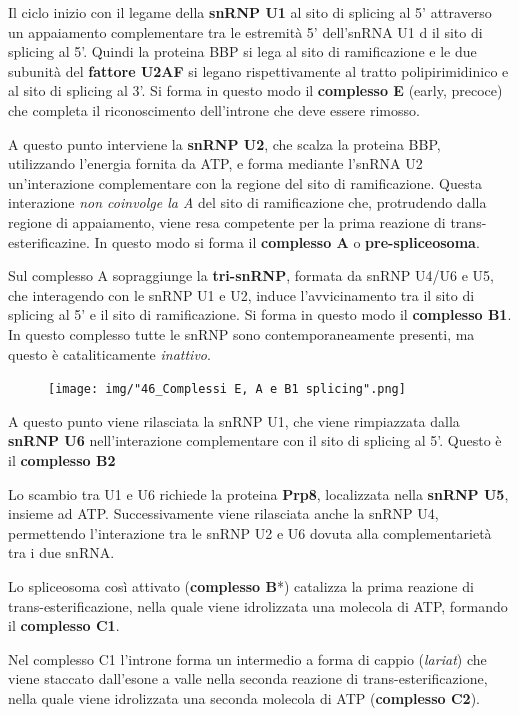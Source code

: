 \documentclass[11pt]{book}
\begin{document}
Il ciclo inizio con il legame della \textbf{snRNP U1} al sito di
splicing al 5' attraverso un appaiamento complementare tra le estremità
5' dell'snRNA U1 d il sito di splicing al 5'. Quindi la proteina BBP si
lega al sito di ramificazione e le due subunità del \textbf{fattore
U2AF} si legano rispettivamente al tratto polipirimidinico e al sito di
splicing al 3'. Si forma in questo modo il \textbf{complesso E} (early,
precoce) che completa il riconoscimento dell'introne che deve essere
rimosso.

A questo punto interviene la \textbf{snRNP U2}, che scalza la proteina
BBP, utilizzando l'energia fornita da ATP, e forma mediante l'snRNA U2
un'interazione complementare con la regione del sito di ramificazione.
Questa interazione \emph{non coinvolge la A} del sito di ramificazione
che, protrudendo dalla regione di appaiamento, viene resa competente per
la prima reazione di trans-esterificazine. In questo modo si forma il
\textbf{complesso A} o \textbf{pre-spliceosoma}.

Sul complesso A sopraggiunge la \textbf{tri-snRNP}, formata da snRNP
U4/U6 e U5, che interagendo con le snRNP U1 e U2, induce l'avvicinamento
tra il sito di splicing al 5' e il sito di ramificazione. Si forma in
questo modo il \textbf{complesso B1}. In questo complesso tutte le snRNP
sono contemporaneamente presenti, ma questo è cataliticamente
\emph{inattivo}.

\begin{figure}[htp]
\centering
\texttt{[image: img/"46\_Complessi E, A e B1 splicing".png]}
\caption{}
\label{complessi-e-a-e-b1-splicing}
\end{figure}

A questo punto viene rilasciata la snRNP U1, che viene rimpiazzata dalla
\textbf{snRNP U6} nell'interazione complementare con il sito di splicing
al 5'. Questo è il \textbf{complesso B2}

Lo scambio tra U1 e U6 richiede la proteina \textbf{Prp8}, localizzata
nella \textbf{snRNP U5}, insieme ad ATP. Successivamente viene
rilasciata anche la snRNP U4, permettendo l'interazione tra le snRNP U2
e U6 dovuta alla complementarietà tra i due snRNA.

Lo spliceosoma così attivato (\textbf{complesso B}*) catalizza la prima
reazione di trans-esterificazione, nella quale viene idrolizzata una
molecola di ATP, formando il \textbf{complesso C1}.

Nel complesso C1 l'introne forma un intermedio a forma di cappio
(\emph{lariat}) che viene staccato dall'esone a valle nella seconda
reazione di trans-esterificazione, nella quale viene idrolizzata una
seconda molecola di ATP (\textbf{complesso C2}).
\end{document}
